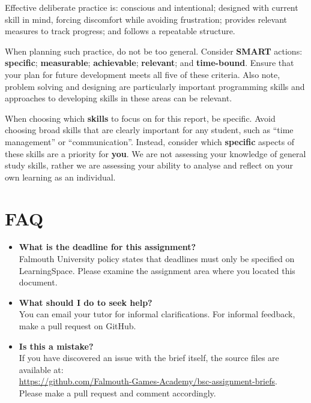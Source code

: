 \documentclass{../fal_assignment}
\begin{document}
Effective deliberate practice is: conscious and intentional; designed with current skill in mind, forcing discomfort while avoiding frustration; provides relevant measures to track progress; and follows a repeatable structure.

When planning such practice, do not be too general. Consider \textbf{SMART} actions: \textbf{specific}; \textbf{measurable}; \textbf{achievable}; \textbf{relevant}; and \textbf{time-bound}. Ensure that your plan for future development meets all five of these criteria. Also note, problem solving and designing are particularly important programming skills and approaches to developing skills in these areas can be relevant.

When choosing which \textbf{skills} to focus on for this report, be specific. Avoid choosing broad skills that are clearly important for any student, such as ``time management'' or ``communication''. Instead, consider which \textbf{specific} aspects of these skills are a priority for \textbf{you}. We are not assessing your knowledge of general study skills, rather we are assessing your ability to analyse and reflect on your own learning as an individual.

\section*{FAQ}

\begin{itemize}
	\item 	\textbf{What is the deadline for this assignment?} \\ 
    		Falmouth University policy states that deadlines must only be specified on LearningSpace. Please examine the assignment area where you located this document.
    			    		    		
	\item 	\textbf{What should I do to seek help?} \\ 
    		You can email your tutor for informal clarifications. For informal feedback, make a pull request on GitHub. 
    		
    	\item 	\textbf{Is this a mistake?} \\ 	
    		If you have discovered an issue with the brief itself, the source files are available at: \\
    		\url{https://github.com/Falmouth-Games-Academy/bsc-assignment-briefs}.\\
    		 Please make a pull request and comment accordingly.
\end{itemize}
\end{document}
